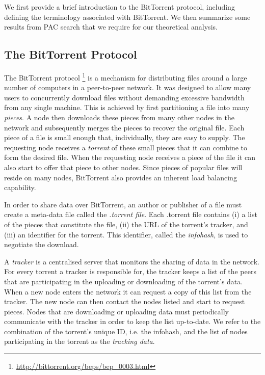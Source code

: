 We first provide a brief introduction to the BitTorrent protocol, including defining the terminology associated with BitTorrent. We then summarize some results from PAC search that we require for our theoretical analysis. 

\subsection{The BitTorrent Protocol}

    The BitTorrent protocol \footnote{\url{http://bittorrent.org/beps/bep_0003.html}} is a mechanism for distributing files around a large number of computers in a peer-to-peer network. It was designed to allow many users to concurrently download files without demanding excessive bandwidth from any single machine. This is achieved by first partitioning a file into many \emph{pieces}. A node then downloads these pieces from many other nodes in the network and subsequently merges the pieces to recover the original file. Each piece of a file is small enough that, individually, they are easy to supply. The requesting node receives a \emph{torrent} of these small pieces that it can combine to form the desired file. When the requesting node receives a piece of the file it can also start to offer that piece to other nodes. Since pieces of popular files will reside on many nodes, BitTorrent also provides an inherent load balancing capability.

    In order to share data over BitTorrent, an author or publisher of a file must create a meta-data file called the \emph{.torrent file}. Each .torrent file contains (i) a list of the pieces that constitute the file, (ii)  the URL of the torrent's tracker, and (iii) an identifier for the torrent. This identifier, called the \emph{infohash}, is used to negotiate the download.

    A \emph{tracker} is a centralised server that monitors the sharing of data in the network. For every torrent a tracker is responsible for, the tracker keeps a list of the peers that are participating in the uploading or downloading of the torrent's data. When a new node enters the network it can request a copy of this list from the tracker. The new node can then contact the nodes listed and start to request pieces. Nodes that are downloading or uploading data must periodically communicate with the tracker in order to keep the list up-to-date. We refer to the combination of the torrent's unique ID, i.e. the infohash, and the list of nodes participating in the torrent as the {\em tracking data}.
    

